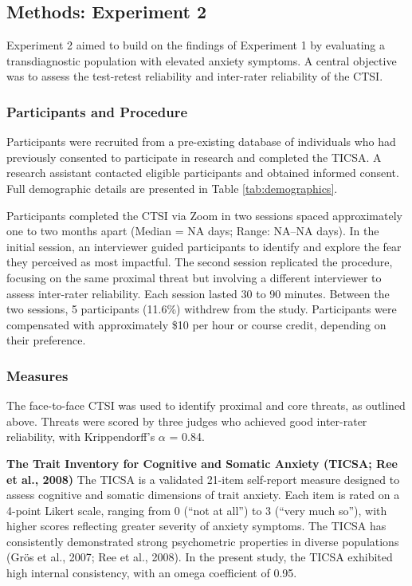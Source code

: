 \documentclass[
  man,floatsintext]{apa7}
\begin{document}
\subsection{Methods: Experiment 2}\label{methods-experiment-2}

Experiment 2 aimed to build on the findings of Experiment 1 by evaluating a transdiagnostic population with elevated anxiety symptoms.
A central objective was to assess the test-retest reliability and inter-rater reliability of the CTSI.

\subsubsection{Participants and Procedure}\label{participants-and-procedure}

Participants were recruited from a pre-existing database of individuals who had previously consented to participate in research and completed the TICSA.
A research assistant contacted eligible participants and obtained informed consent.
Full demographic details are presented in Table \ref{tab:demographics}.

Participants completed the CTSI via Zoom in two sessions spaced approximately one to two months apart (Median = NA days; Range: NA--NA days).
In the initial session, an interviewer guided participants to identify and explore the fear they perceived as most impactful.
The second session replicated the procedure, focusing on the same proximal threat but involving a different interviewer to assess inter-rater reliability.
Each session lasted 30 to 90 minutes.
Between the two sessions, 5 participants (11.6\%) withdrew from the study.
Participants were compensated with approximately \$10 per hour or course credit, depending on their preference.

\subsubsection{Measures}\label{measures-2}

The face-to-face CTSI was used to identify proximal and core threats, as outlined above.
Threats were scored by three judges who achieved good inter-rater reliability, with Krippendorff's \(\alpha\) = 0.84.

\textbf{The Trait Inventory for Cognitive and Somatic Anxiety (TICSA; Ree et al., 2008)}
The TICSA is a validated 21-item self-report measure designed to assess cognitive and somatic dimensions of trait anxiety.
Each item is rated on a 4-point Likert scale, ranging from 0 (``not at all'') to 3 (``very much so''), with higher scores reflecting greater severity of anxiety symptoms.
The TICSA has consistently demonstrated strong psychometric properties in diverse populations (Grös et al., 2007; Ree et al., 2008).
In the present study, the TICSA exhibited high internal consistency, with an omega coefficient of 0.95.
\end{document}
